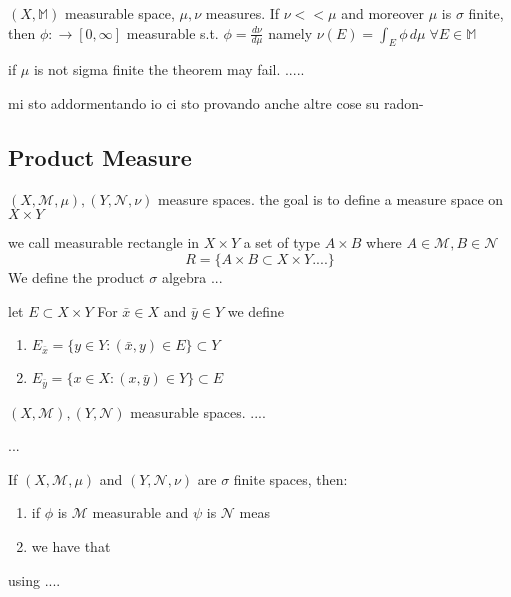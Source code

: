 \begin{theorem}
    \(\left(X, \mathbb{M}\right) \) measurable space, \(\mu, \nu\) measures. If \(\nu << \mu \) and moreover \(\mu \) is \(\sigma\) finite, then \(\phi : \to \left[0, \infty\right]\) measurable s.t.
    \(\phi = \frac{d \nu}{d \mu}\) namely \(\nu(E)= \int_E \phi \, d\mu \; \forall E \in \mathbb{M}\)
\end{theorem}

\begin{remark}
    if \(\mu\) is not sigma finite the theorem may fail.
    ..... 
\end{remark}

mi sto addormentando io ci sto provando anche
altre cose su radon-

\subsection*{Product Measure}
\( (X, \mathcal{M}, \mu), (Y, \mathcal{N}, \nu) \) measure spaces.
the goal is to define a measure space on \(X \times Y\)
\begin{definition}
    we call measurable rectangle in \(X \times Y\) a set of type \(A \times B\) where \(A \in \mathcal{M}, B \in \mathcal{N}\)
    \[  R = \{ A \times B \subset X\times Y ....\}\]
    We define the product \(\sigma\) algebra 
    ...
\end{definition}
\begin{definition}
    let \(E \subset X \times Y \) For \( \bar{x} \in X \) and \(\bar{y} \in Y \) we define
    \begin{enumerate}
        \item \( E_{\bar{x}} = \{ y \in Y: \left( \bar{x}, y \right) \in E \} \subset Y \)
        \item \( E_{\bar{y}} = \{ x \in X: \left( x, \bar{y} \right) \in Y \} \subset E \)
    \end{enumerate}
\end{definition}

\begin{proposition}
    \(\left( X, \mathcal{M} \right), \left( Y, \mathcal{N} \right)\) measurable spaces. 
    ....

\end{proposition}
...

\begin{theorem}
    If \(\left(X, \mathcal{M}, \mu \right)\) and \(\left(Y, \mathcal{N}, \nu \right)\) are \(\sigma\) finite spaces, then:
    \begin{enumerate}
        \item if \(\phi\) is \(\mathcal{M}\) measurable and \(\psi\) is \( \mathcal{N}\) meas
        \item we have that 
    \end{enumerate}

 \end{theorem}
using ....

